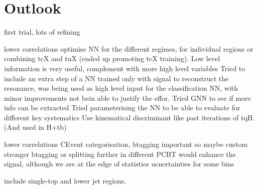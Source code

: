 \section{Outlook}

first trial, lots of refining

lower correlations
optimise NN for the different regimes, for individual regions or combining tcX and tuX (ended up promoting tcX training). Low level information is very useful, complement with more high level variables
Tried to include an extra step of a NN trained only with signal to reconstruct the resonance, was being used as high level input for the classification NN, with minor improvements not bein able to justify the effor. Tried GNN to see if more info can be extracted
Tried parameterising the NN to be able to evaluate for different key systematics
Use kinematical discriminant like past iterations of tqH. (And used in H+tb)

lower correlations
CEvent categorisation, btagging important so maybe custom stronger btagging or splitting further in different PCBT would enhance the signal, although we are at the edge of statistics ucnertainties for some bins

include single-top and lower jet regions.